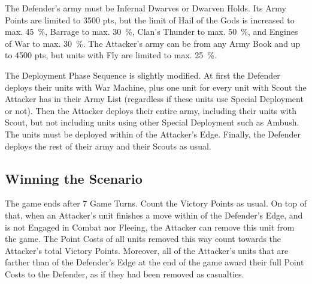 The Defender's army must be Infernal Dwarves or Dwarven Holds. Its Army Points are limited to 3500 pts, but the limit of Hail of the Gods is increased to max. \SI{45}{\percent}, Barrage to max. \SI{30}{\percent}, Clan's Thunder to max. \SI{50}{\percent}, and Engines of War to max. \SI{30}{\percent}. The Attacker's army can be from any Army Book and up to 4500 pts, but units with Fly are limited to max. \SI{25}{\percent}.

The Deployment Phase Sequence is slightly modified. At first the Defender deploys their units with War Machine, plus one unit for every unit with Scout the Attacker has in their Army List (regardless if these units use Special Deployment or not). Then the Attacker deploys their entire army, including their units with Scout, but not including units using other Special Deployment such as Ambush. The units must be deployed within  of the Attacker's Edge. Finally, the Defender deploys the rest of their army and their Scouts as usual.

\subsection*{Winning the Scenario}

The game ends after 7 Game Turns. Count the Victory Points as usual. On top of that, when an Attacker's unit finishes a move within  of the Defender's Edge, and is not Engaged in Combat nor Fleeing, the Attacker can remove this unit from the game. The Point Costs of all units removed this way count towards the Attacker's total Victory Points. Moreover, all of the Attacker's units that are farther than  of the Defender's Edge at the end of the game award their full Point Costs to the Defender, as if they had been removed as casualties.
